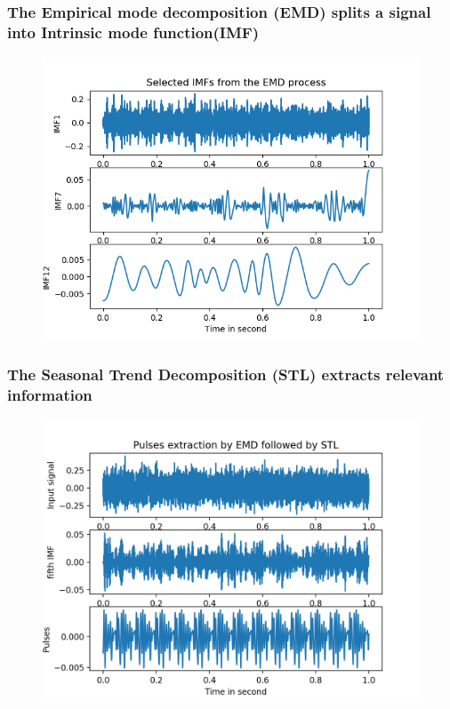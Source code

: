 \documentclass{beamer}
\begin{document}
\begin{frame}
	\frametitle{The Empirical mode decomposition (EMD) splits a signal into Intrinsic mode function(IMF)}
	\begin{figure}[H]
		\centering
		\includegraphics[width=0.8\linewidth]{selected_imf}
	\end{figure}
\end{frame}

\begin{frame}
	\frametitle{The Seasonal Trend Decomposition (STL) extracts relevant information }
	\begin{figure}[H]
		\centering
		\includegraphics[width=0.8\linewidth]{emd-stl}
	\end{figure}
\end{frame}
\end{document}
